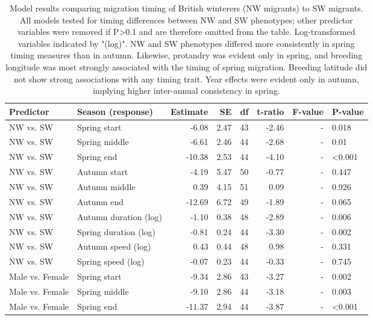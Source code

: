 \documentclass[a4paper, nobind]{templates/ociamthesis}
\begin{document}
\begin{table}[t]

\caption{\label{tab:nw-timing-table}Model results comparing migration timing of British winterers (NW migrants) to SW migrants. All models tested for timing differences between NW and SW phenotypes; other predictor variables were removed if P>0.1 and are therefore omitted from the table. Log-transformed variables indicated by  "(log)". NW and SW phenotypes differed more consistently in spring timing measures than in autumn. Likewise, protandry was evident only in spring, and breeding longitude was most strongly associated with the timing of spring migration. Breeding latitude did not show strong associations with any timing trait. Year effects were evident only in autumn, implying higher inter-annual consistency in spring.}
\centering
\fontsize{9.5}{11.5}\selectfont
\begin{tabular}{l|l|r|r|r|r|r|l}
\hline
Predictor & Season (response) & Estimate & SE & df & t-ratio & F-value & P-value\\
\hline
NW vs. SW & Spring start & -6.08 & 2.47 & 43 & -2.46 & - & 0.018\\
\hline
NW vs. SW & Spring middle & -6.61 & 2.46 & 44 & -2.68 & - & 0.01\\
\hline
NW vs. SW & Spring end & -10.38 & 2.53 & 44 & -4.10 & - & <0.001\\
\hline
NW vs. SW & Autumn start & -4.19 & 5.47 & 50 & -0.77 & - & 0.447\\
\hline
NW vs. SW & Autumn middle & 0.39 & 4.15 & 51 & 0.09 & - & 0.926\\
\hline
NW vs. SW & Autumn end & -12.69 & 6.72 & 49 & -1.89 & - & 0.065\\
\hline
NW vs. SW & Autumn duration (log) & -1.10 & 0.38 & 48 & -2.89 & - & 0.006\\
\hline
NW vs. SW & Spring duration (log) & -0.81 & 0.24 & 44 & -3.30 & - & 0.002\\
\hline
NW vs. SW & Autumn speed (log) & 0.43 & 0.44 & 48 & 0.98 & - & 0.331\\
\hline
NW vs. SW & Spring speed (log) & -0.07 & 0.23 & 44 & -0.33 & - & 0.745\\
\hline
Male vs. Female & Spring start & -9.34 & 2.86 & 43 & -3.27 & - & 0.002\\
\hline
Male vs. Female & Spring middle & -9.10 & 2.86 & 44 & -3.18 & - & 0.003\\
\hline
Male vs. Female & Spring end & -11.37 & 2.94 & 44 & -3.87 & - & <0.001\\

\end{tabular}
\end{table}
\end{document}

